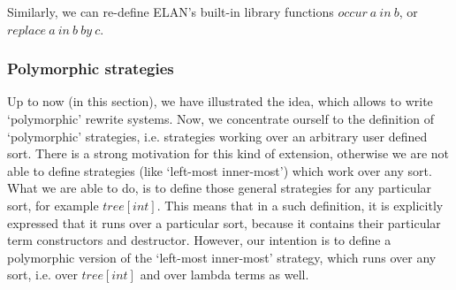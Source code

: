 \documentclass{article}
\begin{document}
{\noindent
Similarly, we can re-define ELAN's built-in library functions
$occur~a~in~b$, or $replace~a~in~b~by~c$.

\subsubsection{Polymorphic strategies}

Up to now (in this section), we have illustrated the idea, which allows to
write `polymorphic' rewrite systems. Now, we concentrate ourself to the definition
of `polymorphic' strategies, i.e. strategies working over an arbitrary user defined sort. 
There is a strong motivation for this kind of extension, otherwise
we are not able to define strategies (like `left-most inner-most')
which work over any sort. What we are able to do, 
is to define those general strategies
for any particular sort, for example $tree[int]$. This means that
in a such definition, it is explicitly expressed that it runs
over a particular sort,  because it contains their particular term 
constructors and destructor.
However, our intention is to define a polymorphic version of 
the `left-most inner-most' strategy, which runs over any sort, i.e. over
$tree[int]$ and over lambda terms as well.

}
\end{document}

